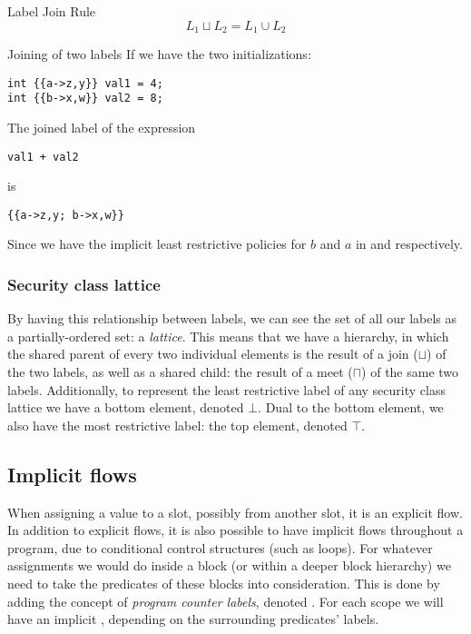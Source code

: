 \begin{definition}{Label Join Rule}
  \[
    L_1 \sqcup L_2 = L_1 \cup L_2
  \]
\end{definition}

\begin{example}{Joining of two labels}
  If we have the two initializations:
  \begin{lstlisting}[style=dlmc]
int {{a->z,y}} val1 = 4;
int {{b->x,w}} val2 = 8;
  \end{lstlisting}
  The joined label of the expression\\
  \begin{lstlisting}[style=dlmc]
val1 + val2
  \end{lstlisting}
  is
  \begin{lstlisting}[style=dlmc]
{{a->z,y; b->x,w}}
  \end{lstlisting}
  Since we have the implicit least restrictive policies for $b$ and $a$ in  and  respectively.
\end{example}

\subsubsection{Security class lattice}
By having this relationship between labels, we can see the set of all our labels as a partially-ordered set: a \emph{lattice}.
This means that we have a hierarchy, in which the shared parent of every two individual elements is the result of a join ($\sqcup$) of the two labels, as well as a shared child: the result of a meet ($\sqcap$) of the same two labels.
Additionally, to represent the least restrictive label of any security class lattice we have a bottom element, denoted $\bot$.
Dual to the bottom element, we also have the most restrictive label: the top element, denoted $\top$.

\subsection{Implicit flows}\label{dlm:implicit_flows}
When assigning a value to a slot, possibly from another slot, it is an explicit flow.
In addition to explicit flows, it is also possible to have implicit flows throughout a program, due to conditional control structures (such as loops).
For whatever assignments we would do inside a block (or within a deeper block hierarchy) we need to take the predicates of these blocks into consideration.
This is done by adding the concept of \emph{program counter labels}, denoted \dlmpc.
For each scope we will have an implicit \dlmpc, depending on the surrounding predicates' labels.

